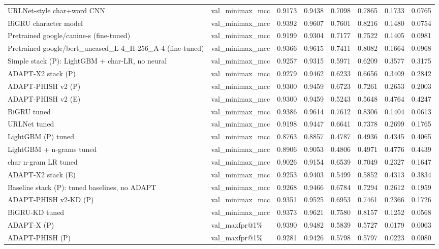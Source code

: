 \begin{table}[t]
\begin{tabular}{llrrrrrr}
URLNet-style char+word CNN & val\_minimax\_mcc & 0.9173 & 0.9438 & 0.7098 & 0.7865 & 0.1733 & 0.0765 \\
BiGRU character model & val\_minimax\_mcc & 0.9392 & 0.9607 & 0.7601 & 0.8216 & 0.1480 & 0.0754 \\
Pretrained google/canine-s (fine-tuned) & val\_minimax\_mcc & 0.9199 & 0.9304 & 0.7177 & 0.7522 & 0.1405 & 0.0981 \\
Pretrained google/bert\_uncased\_L-4\_H-256\_A-4 (fine-tuned) & val\_minimax\_mcc & 0.9366 & 0.9615 & 0.7411 & 0.8082 & 0.1664 & 0.0968 \\
Simple stack (P): LightGBM + char-LR, no neural & val\_minimax\_mcc & 0.9257 & 0.9315 & 0.5971 & 0.6209 & 0.3577 & 0.3175 \\
ADAPT-X2 stack (P) & val\_minimax\_mcc & 0.9279 & 0.9462 & 0.6233 & 0.6656 & 0.3409 & 0.2842 \\
ADAPT-PHISH v2 (P) & val\_minimax\_mcc & 0.9300 & 0.9459 & 0.6723 & 0.7261 & 0.2653 & 0.2003 \\
ADAPT-PHISH v2 (E) & val\_minimax\_mcc & 0.9300 & 0.9459 & 0.5243 & 0.5648 & 0.4764 & 0.4247 \\
BiGRU tuned & val\_minimax\_mcc & 0.9386 & 0.9614 & 0.7612 & 0.8306 & 0.1404 & 0.0613 \\
URLNet tuned & val\_minimax\_mcc & 0.9198 & 0.9447 & 0.6641 & 0.7378 & 0.2699 & 0.1765 \\
LightGBM (P) tuned & val\_minimax\_mcc & 0.8763 & 0.8857 & 0.4787 & 0.4936 & 0.4345 & 0.4065 \\
LightGBM + n-grams tuned & val\_minimax\_mcc & 0.8906 & 0.9053 & 0.4806 & 0.4971 & 0.4776 & 0.4439 \\
char n-gram LR tuned & val\_minimax\_mcc & 0.9026 & 0.9154 & 0.6539 & 0.7049 & 0.2327 & 0.1647 \\
ADAPT-X2 stack (E) & val\_minimax\_mcc & 0.9253 & 0.9403 & 0.5499 & 0.5852 & 0.4313 & 0.3834 \\
Baseline stack (P): tuned baselines, no ADAPT & val\_minimax\_mcc & 0.9268 & 0.9466 & 0.6784 & 0.7294 & 0.2612 & 0.1959 \\
ADAPT-PHISH v2-KD (P) & val\_minimax\_mcc & 0.9351 & 0.9525 & 0.6953 & 0.7461 & 0.2366 & 0.1726 \\
BiGRU-KD tuned & val\_minimax\_mcc & 0.9373 & 0.9621 & 0.7580 & 0.8157 & 0.1252 & 0.0568 \\
ADAPT-X (P) & val\_maxfpr@1\% & 0.9390 & 0.9482 & 0.5839 & 0.5727 & 0.0179 & 0.0063 \\
ADAPT-PHISH (P) & val\_maxfpr@1\% & 0.9281 & 0.9426 & 0.5798 & 0.5797 & 0.0223 & 0.0080 \\

\end{tabular}
\end{table}
